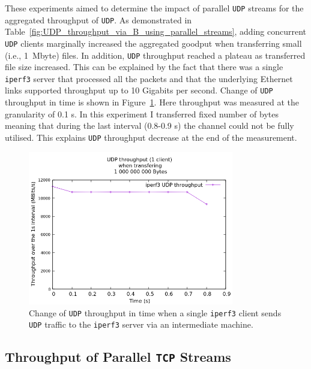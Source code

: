 \documentclass[12pt,a4paper]{report}
\begin{document}
These experiments aimed to determine the impact of parallel \texttt{UDP} streams for the aggregated throughput of \texttt{UDP}.
As demonstrated in Table~\ref{fig:UDP_throughput_via_B_using_parallel_streams}, adding concurrent \texttt{UDP} clients marginally increased the aggregated goodput when transferring small (i.e., 1~Mbyte) files.
In addition, \texttt{UDP} throughput reached a plateau as transferred file size increased.
This can be explained by the fact that there was a single \texttt{iperf3} server that processed all the packets and that the underlying Ethernet links supported throughput up to 10 Gigabits per second.
Change of \texttt{UDP} throughput in time is shown in Figure~\ref{fig:UDP_throughput_in_time}.
Here throughput was measured at the granularity of 0.1 s.
In this experiment I transferred fixed number of bytes meaning that during the last interval (0.8-0.9 s) the channel could not be fully utilised.
This explains \texttt{UDP} throughput decrease at the end of the measurement. 


    \begin{figure}[H]
    \centering
    \includegraphics[width=0.8\textwidth]{figs/UDP_throughput_in_time.png}
    \caption[Change of \texttt{UDP} throughput in time when a single \texttt{iperf3} client sends \texttt{UDP} traffic to the \texttt{iperf3} server via an intermediate machine]{Change of \texttt{UDP} throughput in time when a single \texttt{iperf3} client sends \texttt{UDP} traffic to the \texttt{iperf3} server via an intermediate machine.}
    \label{fig:UDP_throughput_in_time}
    \end{figure}

\subsection{Throughput of Parallel \texttt{TCP} Streams}
\end{document}

